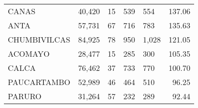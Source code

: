 \begin{tabular}{lrcclr}
	\cellcolor[HTML]{FFFF99}CANAS                                  & 40,420                                                         & 15                                                         & 539                  & 554                                                                 & 137.06                                                                       \\
	\cellcolor[HTML]{FFFF99}ANTA                                   & 57,731                                                         & 67                                                         & 716                  & 783                                                                 & 135.63                                                                       \\
	\cellcolor[HTML]{C6E0B4}CHUMBIVILCAS                           & 84,925                                                         & 78                                                         & 950                  & 1,028                                                               & 121.05                                                                       \\
	\cellcolor[HTML]{C6E0B4}ACOMAYO                                & 28,477                                                         & 15                                                         & 285                  & 300                                                                 & 105.35                                                                       \\
	\cellcolor[HTML]{C6E0B4}CALCA                                  & 76,462                                                         & 37                                                         & 733                  & 770                                                                 & 100.70                                                                       \\
	\cellcolor[HTML]{C6E0B4}PAUCARTAMBO                            & 52,989                                                         & 46                                                         & 464                  & 510                                                                 & 96.25                                                                        \\
	\cellcolor[HTML]{C6E0B4}PARURO                                 & 31,264                                                         & 57                                                         & 232                  & 289                                                                 & 92.44                                                                        \\

\end{tabular}
